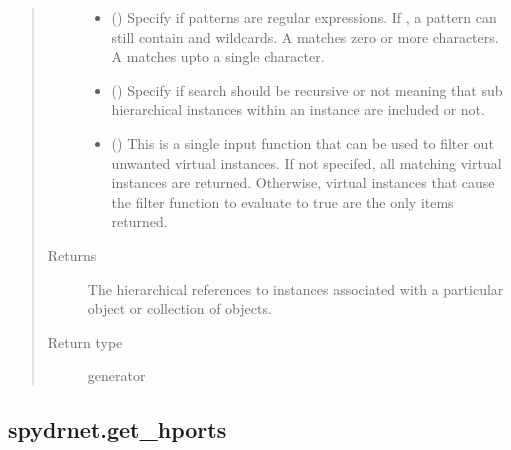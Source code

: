 \documentclass[letterpaper,10pt,english,openany,oneside]{sphinxmanual}
\begin{document}
\begin{fulllineitems}
\begin{quote}
\begin{description}
\begin{itemize}
\item {} 
 () \textendash{} Specify if patterns are regular expressions. If , a pattern can still contain \sphinxtitleref{*} and  wildcards. A
\sphinxtitleref{*} matches zero or more characters. A  matches upto a single character.

\item {} 
 () \textendash{} Specify if search should be recursive or not meaning that sub hierarchical instances within an instance are
included or not.

\item {} 
 () \textendash{} This is a single input function that can be used to filter out unwanted virtual instances. If not specifed, all
matching virtual instances are returned. Otherwise, virtual instances that cause the filter function to evaluate
to true are the only items returned.

\end{itemize}

\item[{Returns}] \leavevmode
{} \textendash{} The hierarchical references to instances associated with a particular object or collection of objects.

\item[{Return type}] \leavevmode
generator

\end{description}\end{quote}

\end{fulllineitems}



\subsection{spydrnet.get\_hports}
\label{\detokenize{reference/classes/generated/spydrnet.get_hports:spydrnet-get-hports}}\label{\detokenize{reference/classes/generated/spydrnet.get_hports::doc}}
\end{document}

